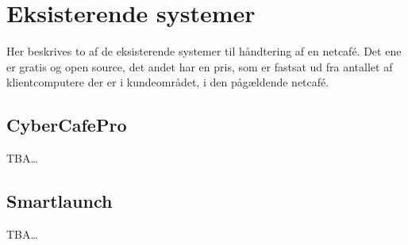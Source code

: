 \section{Eksisterende systemer}\label{sec:eksisterende-systemer}

Her beskrives to af de eksisterende systemer til håndtering af en netcafé. Det ene er gratis og open source, det andet har en pris, som er fastsat ud fra antallet af klientcomputere der er i kundeområdet, i den pågældende netcafé.


\subsection{CyberCafePro}\label{subsec:cybercafepro}

TBA\ldots


\subsection{Smartlaunch}\label{subsec:smartlaunch}

TBA\ldots
